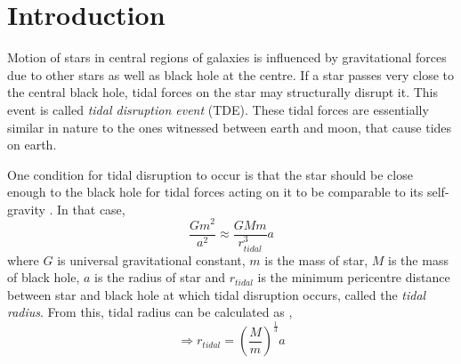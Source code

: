 \documentclass{tda}
\begin{document}

\section{Introduction} \label{introduction}

Motion of stars in central regions of galaxies is influenced by gravitational forces due to other stars as well as black hole at the centre. If a star passes very close to the central black hole, tidal forces on the star may structurally disrupt it. This event is called \emph{tidal disruption event} (TDE). These tidal forces are essentially similar in nature to the ones witnessed between earth and moon, that cause tides on earth. 

One condition for tidal disruption to occur is that the star should be close enough to the black hole for tidal forces acting on it to be comparable to its self-gravity \cite{hills_possible_1975}. In that case, 
\[\frac{G m^2}{a^2} \approx \frac{G M m}{r_{tidal}^3} a\]
where \(G\) is universal gravitational constant, \(m\) is the mass of star, \(M\) is the mass of black hole, \(a\) is the radius of star and \(r_{tidal}\) is the minimum pericentre distance between star and black hole at which tidal disruption occurs, called the \emph{tidal radius}. From this, tidal radius can be calculated as \cite{rees_tidal_1988}, 
\begin{equation}
	\Rightarrow r_{tidal} = \left( \frac{M}{m} \right) ^{\frac{1}{3}} a
	\label{eq:tidal_radius}
\end{equation}
\end{document}
